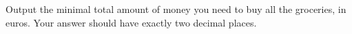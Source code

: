 
    Output the minimal total amount of money you need to buy all the groceries, in euros.
    Your answer should have exactly two decimal places.
